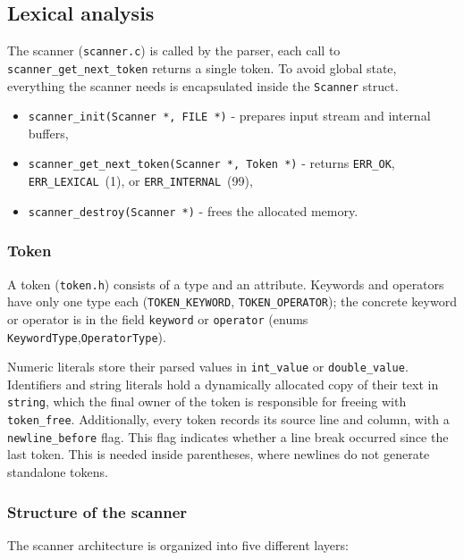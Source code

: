 \documentclass[a4paper]{article}
\begin{document}
\subsection{Lexical analysis}

The scanner (\texttt{scanner.c}) is called by the parser, each call to
\texttt{scanner\_get\_next\_token} returns a single token.
To avoid global state, everything the scanner needs is encapsulated inside the \texttt{Scanner} struct.

\begin{itemize}
    \item \texttt{scanner\_init(Scanner *, FILE *)} - prepares input stream and internal buffers,
    \item \texttt{scanner\_get\_next\_token(Scanner *, Token *)} - returns \texttt{ERR\_OK},
          \texttt{ERR\_LEXICAL}~(1), or \texttt{ERR\_INTERNAL}~(99),
    \item \texttt{scanner\_destroy(Scanner *)} - frees the allocated memory.
\end{itemize}

\subsubsection{Token}
A token (\texttt{token.h}) consists of a type and an attribute. Keywords and operators have only
one type each (\texttt{TOKEN\_KEYWORD}, \texttt{TOKEN\_OPERATOR}); the concrete keyword or operator
is in the field \texttt{keyword} or \texttt{operator} (enums \texttt{KeywordType},\texttt{OperatorType}).

Numeric literals store their parsed values in \texttt{int\_value} or \texttt{double\_value}. Identifiers and string literals hold a dynamically allocated copy of their text in \texttt{string}, which the final owner of the token is responsible for freeing with \texttt{token\_free}. Additionally, every token records its source line and column, with a \texttt{newline\_before} flag. This flag indicates whether a line break occurred since the last token. This is needed inside parentheses, where newlines do not generate standalone tokens.

\subsubsection{Structure of the scanner}
The scanner architecture is organized into five different layers:
\end{document}
